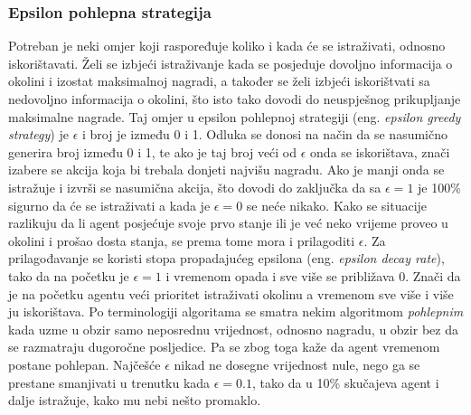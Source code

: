 \subsubsection{Epsilon pohlepna strategija}
Potreban je neki omjer koji raspoređuje koliko i kada će se istraživati, odnosno iskorištavati. Želi se izbjeći istraživanje kada se posjeduje dovoljno informacija o okolini i izostat maksimalnoj nagradi, a također se želi izbjeći iskorištvati sa nedovoljno informacija o okolini, što isto tako dovodi do neuspješnog prikupljanje maksimalne nagrade. Taj omjer u epsilon pohlepnoj strategiji (eng. \textit{epsilon greedy strategy}) je $\epsilon$ i broj je između 0 i 1. Odluka se donosi na način da se nasumično generira broj između 0 i 1, te ako je taj broj veći od $\epsilon$ onda se iskorištava, znači izabere se akcija koja bi trebala donjeti najvišu nagradu. Ako je manji onda se istražuje i izvrši se nasumična akcija, što dovodi do zaključka da sa $\epsilon = 1$ je 100\% sigurno da će se istraživati a kada je $\epsilon = 0$ se neće nikako. Kako se situacije razlikuju da li agent posjećuje svoje prvo stanje ili je već neko vrijeme proveo u okolini i prošao dosta stanja, se prema tome mora i prilagoditi $\epsilon$. Za prilagođavanje se koristi stopa propadajućeg epsilona (eng. \textit{epsilon decay rate}), tako da na početku je $\epsilon = 1$ i vremenom opada i sve više se približava 0. Znači da je na početku agentu veći prioritet istraživati okolinu a vremenom sve više i više ju iskorištava. Po terminologiji algoritama se smatra nekim algoritmom \emph{pohlepnim} kada uzme u obzir samo neposrednu vrijednost, odnosno nagradu, u obzir bez da se razmatraju dugoročne posljedice. Pa se zbog toga kaže da agent vremenom postane pohlepan. Najčešće $\epsilon$ nikad ne dosegne vrijednost nule, nego ga se prestane smanjivati u trenutku kada $\epsilon = 0.1$, tako da u 10\% skučajeva agent i dalje istražuje, kako mu nebi nešto promaklo.

